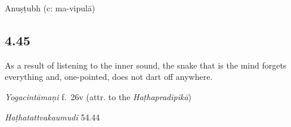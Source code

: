 \begin{ekdosis}
\begin{philcomm}[hp04_044_1]


\end{philcomm}

\begin{metre}[hp04_044_1]
Anuṣṭubh (c: ma-vipulā)
\end{metre}

\subsection*{4.45}
\begin{translation}[hp04_045]
As a result of listening to the inner sound, the snake that is the mind forgets everything and, one-pointed, does not dart off anywhere.
\end{translation}


\begin{testimonia}[hp04_045]
\emph{Yogacintāmaṇi} f.~26v (attr. to the \emph{Haṭhapradīpikā})
\begin{versinnote}
\end{versinnote}

\emph{Haṭhatattvakaumudī} 54.44
\begin{versinnote}
\end{versinnote}
\end{testimonia}


\end{ekdosis}
